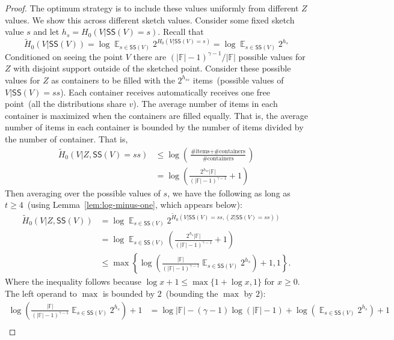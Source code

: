 \documentclass[11pt]{article}
\newcommand{\lemref}[1]{\mbox{Lemma~\ref{#1}}}
\DeclareMathOperator*{\expe}{\mathbb{E}}
\newcommand{\class}[1]{{\ensuremath{\mathsf{#1}}}}
\newcommand{\sketch}{\ensuremath{\class{SS}}\xspace}
\begin{document}
\begin{proof}
The optimum strategy is to include these values uniformly from different $Z$ values.
We show this across different sketch values.  Consider some fixed sketch value $s$ and let $h_s= H_0(V | \sketch(V) = s)$.  %
Recall that 
\[
\tilde{H}_0(V | \sketch(V)) =  \log \expe_{s\in \sketch(V)} 2^{H_0(V | \sketch(V) = s)}  = \log \expe_{s\in \sketch(V)} 2^{h_s} %
\]  
Conditioned on seeing the point $V$ there are $(|\mathbb{F}|-1)^{\gamma-1}/|\mathbb{F}|$ possible values for $Z$ with disjoint support outside of the sketched point.  Consider these possible values for $Z$ as containers to be filled with the $2^{h_{ss}}$ items~(possible values of $V | \sketch(V)=ss$).  Each container receives automatically receives one free point~(all the distributions share $v$).  The average number of items in each container is maximized when the containers are filled equally.  That is, the average number of items in each container is bounded by the number of items divided by the number of container.  That is, 
\begin{align*}
\tilde{H}_0(V |Z  , \sketch(V) = ss) &\le \log \left(\frac{\text{\# items}+\text{\# containers}}{\text{\# containers}}\right)\\
&= \log \left(\frac{2^{h_{ss}}|\mathbb{F}|}{(|\mathbb{F}|-1)^{\gamma-1}} +1 \right)
\end{align*}
Then averaging over the possible values of $s$, we have the following as long as $t\ge 4$~(using  \lemref{lem:log-minus-one}, which appears below):
\begin{align*}
\tilde{H}_0(V |Z , \sketch(V) ) &= \log \expe_{s\in \sketch(V)} 2^{\tilde{H}_0(V |  \sketch(V) =ss , (Z| \sketch(V) =ss) )}\\
&= \log\expe_{s\in \sketch(V)} \left(\frac{2^{h_s}|\mathbb{F}|}{(|\mathbb{F}|-1)^{\gamma-1}} +1\right)\\
&\le \max\left\{ \log \left(\frac{|\mathbb{F}|}{(|\mathbb{F}|-1)^{\gamma-1}} \expe_{s\in \sketch(V)} 2^{h_s}\right)+1, 1\right\}.
\end{align*}
Where the inequality follows because $\log x+1 \le \max\{ 1+ \log x,1\}$ for $x\ge 0$.
The left operand to $\max$ is bounded by $2$~(bounding the $\max$ by $2$):
\begin{align*}
\log \left(\frac{|\mathbb{F}|}{(|\mathbb{F}|-1)^{\gamma-1}} \expe_{s\in \sketch(V)} 2^{h_s}\right)+1
&=\log |\mathbb{F}| - (\gamma -1)\log (|\mathbb{F}|-1) + \log \left(\expe_{s\in \sketch(V)} 2^{h_s}\right) +1\\

\end{align*}
\end{proof}
\end{document}
